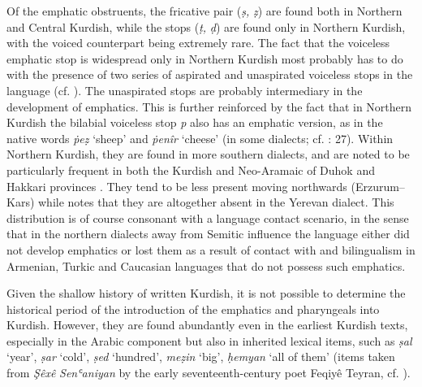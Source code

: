 \documentclass[output=paper]{langsci/langscibook}
\begin{document}
Of the emphatic obstruents, the fricative pair (\textit{ṣ,} \textit{ẓ}) are found both in Northern and Central Kurdish, while the stops (\textit{ṭ,} \textit{ḍ}) are found only in Northern Kurdish, with the voiced counterpart being extremely rare. The fact that the voiceless emphatic stop is widespread only in Northern Kurdish most probably has to do with the presence of two series of aspirated and unaspirated voiceless stops in the language (cf. ). The unaspirated stops are probably intermediary in the development of emphatics. This is further reinforced by the fact that in Northern Kurdish the bilabial voiceless stop \textit{p} also has an emphatic version, as in the native words \textit{ṗeẓ} ‘sheep’ and \textit{ṗenîr} ‘cheese’ (in some dialects; cf. \citealt{Kahn1976}: 27). Within Northern Kurdish, they are found in more southern dialects, and are noted to be particularly frequent in both the Kurdish and Neo-Aramaic of Duhok and Hakkari provinces  \citep[329]{Blau1989}. They tend to be less present moving northwards (Erzurum–Kars) while \citet[43]{MacKenzie1961} notes that they are altogether absent in the Yerevan dialect. This distribution is of course consonant with a language contact scenario, in the sense that in the northern dialects away from Semitic influence the language either did not develop emphatics or lost them as a result of contact with and bilingualism in Armenian, Turkic and Caucasian languages that do not possess such emphatics.   

Given the shallow history of written Kurdish, it is not possible to determine the historical period of the introduction of the emphatics and pharyngeals into Kurdish. However, they are found abundantly even in the earliest Kurdish texts, especially in the Arabic component but also in inherited lexical items, such as \textit{ṣal} ‘year’, \textit{ṣar} ‘cold’, \textit{ṣed} ‘hundred’, \textit{meẓin} ‘big’, \textit{ḥemyan} ‘all of them’ (items taken from \textit{Şêxê} \textit{Senʿaniyan} by the early seventeenth-century poet Feqiyê Teyran, cf. \citet{Teyran2011}). 
\end{document}
